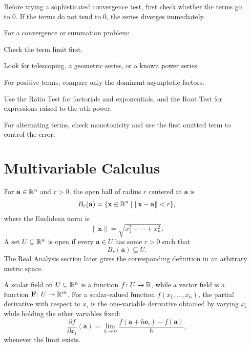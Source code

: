     \begin{strategy}
        Before trying a sophisticated convergence test, first check whether the
        terms go to $0$. If the terms do not tend to $0$, the series diverges
        immediately.
    \end{strategy}

    \begin{algorithm}
        For a convergence or summation problem:
        \begin{bookitems}
            \item Check the term limit first.
            \item Look for telescoping, a geometric series, or a known power
                  series.
            \item For positive terms, compare only the dominant asymptotic
                  factors.
            \item Use the Ratio Test for factorials and exponentials, and the
                  Root Test for expressions raised to the $n$th power.
            \item For alternating terms, check monotonicity and use the first
                  omitted term to control the error.
        \end{bookitems}
    \end{algorithm}

    \section*{Multivariable Calculus}

    \begin{definition}
        For $\mathbf{a}\in\mathbb{R}^n$ and $r>0$, the open ball of radius $r$ centered at
        $\mathbf{a}$ is
        \[
            B_r(\mathbf{a})
            =
            \{\mathbf{x}\in\mathbb{R}^n\mid \|\mathbf{x}-\mathbf{a}\|<r\},
        \]
        where the Euclidean norm is
        \[
            \|\mathbf{x}\|
            =
            \sqrt{x_1^2+\cdots+x_n^2}.
        \]
        A set $U\subseteq\mathbb{R}^n$ is open if every $\mathbf{a}\in U$ has some
        $r>0$ such that
        \[
            B_r(\mathbf{a})\subseteq U.
        \]
        The Real Analysis section later gives the corresponding definition in an
        arbitrary metric space.
    \end{definition}

    \begin{definition}
        A scalar field on $U\subseteq\mathbb{R}^n$ is a function $f\colon U\to\mathbb{R}$, while a
        vector field is a function $\mathbf{F}\colon U\to\mathbb{R}^m$. For a scalar-valued
        function $f(x_1,\dots,x_n)$, the partial derivative with respect to
        $x_i$ is the one-variable derivative obtained by varying $x_i$ while
        holding the other variables fixed:
        \[
            \frac{\partial f}{\partial x_i}(\mathbf{a})
            =
            \lim\limits_{h\to0}
            \frac{f(\mathbf{a}+h\mathbf{e}_i)-f(\mathbf{a})}{h},
        \]
        whenever the limit exists.
    \end{definition}

